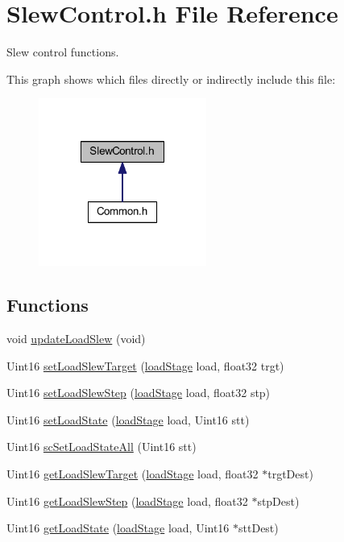 \hypertarget{a00049}{\section{Slew\-Control.\-h File Reference}
\label{a00049}
}


Slew control functions.  


This graph shows which files directly or indirectly include this file\-:\nopagebreak
\begin{figure}[H]
\begin{center}
\leavevmode
\includegraphics[width=156pt]{a00076}
\end{center}
\end{figure}
\subsection*{Functions}
\begin{DoxyCompactItemize}
\item 
void \hyperlink{a00049_a781fe23cb47009003e6d7b8343a377fa}{update\-Load\-Slew} (void)
\item 
Uint16 \hyperlink{a00049_ad63e5af40eafbdbee44b0d9ba262938e}{set\-Load\-Slew\-Target} (\hyperlink{a00027_a2820f1e18d921d2f1e97d53404b9fbae}{load\-Stage} load, float32 trgt)
\item 
Uint16 \hyperlink{a00049_a41068edf467083d665415325d740597d}{set\-Load\-Slew\-Step} (\hyperlink{a00027_a2820f1e18d921d2f1e97d53404b9fbae}{load\-Stage} load, float32 stp)
\item 
Uint16 \hyperlink{a00049_aaed01ad584fe8b8abc60a331a4a4d93f}{set\-Load\-State} (\hyperlink{a00027_a2820f1e18d921d2f1e97d53404b9fbae}{load\-Stage} load, Uint16 stt)
\item 
Uint16 \hyperlink{a00049_a10a32f13494f2c512b842f1d8c8dce5e}{sc\-Set\-Load\-State\-All} (Uint16 stt)
\item 
Uint16 \hyperlink{a00049_a68b8d72a4fb538eb9fc48ef7f4da6b3e}{get\-Load\-Slew\-Target} (\hyperlink{a00027_a2820f1e18d921d2f1e97d53404b9fbae}{load\-Stage} load, float32 $\ast$trgt\-Dest)
\item 
Uint16 \hyperlink{a00049_afb54a11e7330f5138fefae6f817d5f19}{get\-Load\-Slew\-Step} (\hyperlink{a00027_a2820f1e18d921d2f1e97d53404b9fbae}{load\-Stage} load, float32 $\ast$stp\-Dest)
\item 
Uint16 \hyperlink{a00049_a7acfc910c5e8faeb7b227684019d2060}{get\-Load\-State} (\hyperlink{a00027_a2820f1e18d921d2f1e97d53404b9fbae}{load\-Stage} load, Uint16 $\ast$stt\-Dest)
\end{DoxyCompactItemize}


